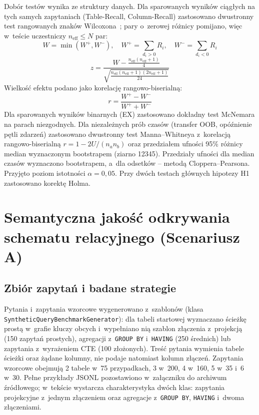 Dobór testów wynika ze struktury danych. Dla sparowanych wyników ciągłych na tych samych zapytaniach (Table-Recall, Column-Recall) zastosowano dwustronny test rangowanych znaków Wilcoxona~\cite{wilcoxon1945}; pary o~zerowej różnicy pomijano, więc w~teście uczestniczy $n_{\text{eff}} \le N$ par:
\begin{equation}
W = \min(W^+, W^-), \quad W^+ = \sum_{d_i > 0} R_i, \quad W^- = \sum_{d_i < 0} R_i
\label{eq:wilcoxon_w_stat}
\end{equation}
\begin{equation}
z = \frac{W - \frac{n_{\text{eff}}(n_{\text{eff}}+1)}{4}}{\sqrt{\frac{n_{\text{eff}}(n_{\text{eff}}+1)(2n_{\text{eff}}+1)}{24}}}
\label{eq:wilcoxon_z_stat}
\end{equation}
Wielkość efektu podano jako korelację rangowo-biserialną:
\begin{equation}
r = \frac{W^+ - W^-}{W^+ + W^-}
\label{eq:wilcoxon_effect_size}
\end{equation}
Dla sparowanych wyników binarnych (EX) zastosowano dokładny test McNemara na parach niezgodnych. Dla niezależnych prób czasów (transfer OOB, opóźnienie pętli zdarzeń) zastosowano dwustronny test Manna--Whitneya z~korelacją rangowo-biserialną $r = 1 - 2U/(n_a n_b)$ oraz przedziałem ufności 95\% różnicy median wyznaczonym bootstrapem (ziarno 12345). Przedziały ufności dla median czasów wyznaczono bootstrapem, a~dla odsetków -- metodą Cloppera--Pearsona. Przyjęto poziom istotności $\alpha = 0{,}05$. Przy dwóch testach głównych hipotezy H1 zastosowano korektę Holma.


\section{Semantyczna jakość odkrywania schematu relacyjnego (Scenariusz A)}
\label{sec:wyniki_scenariusz_a}

\subsection{Zbiór zapytań i badane strategie}

Pytania i~zapytania wzorcowe wygenerowano z~szablonów (klasa \texttt{Synthetic\-Query\-Benchmark\-Generator}): dla tabeli startowej wyznaczano ścieżkę prostą w~grafie kluczy obcych i~wypełniano nią szablon złączenia z~projekcją (150 zapytań prostych), agregacji z~\texttt{GROUP BY} i~\texttt{HAVING} (250 średnich) lub zapytania z~wyrażeniem CTE (100 złożonych). Treść pytania wymienia tabele ścieżki oraz żądane kolumny, nie podaje natomiast kolumn złączeń. Zapytania wzorcowe obejmują 2 tabele w~75 przypadkach, 3 w~200, 4 w~160, 5 w~35 i~6 w~30. Pełne przykłady JSONL pozostawiono w~załączniku do archiwum źródłowego; w~tekście wystarcza charakterystyka dwóch klas: zapytania projekcyjne z~jednym złączeniem oraz agregacje z~\texttt{GROUP BY}, \texttt{HAVING} i~dwoma złączeniami.

